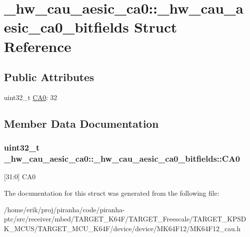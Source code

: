 \hypertarget{struct__hw__cau__aesic__ca0_1_1__hw__cau__aesic__ca0__bitfields}{}\section{\+\_\+hw\+\_\+cau\+\_\+aesic\+\_\+ca0\+:\+:\+\_\+hw\+\_\+cau\+\_\+aesic\+\_\+ca0\+\_\+bitfields Struct Reference}
\label{struct__hw__cau__aesic__ca0_1_1__hw__cau__aesic__ca0__bitfields}
\subsection*{Public Attributes}
\begin{DoxyCompactItemize}
\item 
uint32\+\_\+t \hyperlink{struct__hw__cau__aesic__ca0_1_1__hw__cau__aesic__ca0__bitfields_a8fdcb667229fcd655d53703ee2c9c69c}{C\+A0}\+: 32
\end{DoxyCompactItemize}


\subsection{Member Data Documentation}
\subsubsection[{\texorpdfstring{C\+A0}{CA0}}]{\setlength{\rightskip}{0pt plus 5cm}uint32\+\_\+t \+\_\+hw\+\_\+cau\+\_\+aesic\+\_\+ca0\+::\+\_\+hw\+\_\+cau\+\_\+aesic\+\_\+ca0\+\_\+bitfields\+::\+C\+A0}\hypertarget{struct__hw__cau__aesic__ca0_1_1__hw__cau__aesic__ca0__bitfields_a8fdcb667229fcd655d53703ee2c9c69c}{}\label{struct__hw__cau__aesic__ca0_1_1__hw__cau__aesic__ca0__bitfields_a8fdcb667229fcd655d53703ee2c9c69c}
\mbox{[}31\+:0\mbox{]} C\+A0 

The documentation for this struct was generated from the following file\+:\begin{DoxyCompactItemize}
\item 
/home/erik/proj/piranha/code/piranha-\/ptc/src/receiver/mbed/\+T\+A\+R\+G\+E\+T\+\_\+\+K64\+F/\+T\+A\+R\+G\+E\+T\+\_\+\+Freescale/\+T\+A\+R\+G\+E\+T\+\_\+\+K\+P\+S\+D\+K\+\_\+\+M\+C\+U\+S/\+T\+A\+R\+G\+E\+T\+\_\+\+M\+C\+U\+\_\+\+K64\+F/device/device/\+M\+K64\+F12/M\+K64\+F12\+\_\+cau.\+h\end{DoxyCompactItemize}
